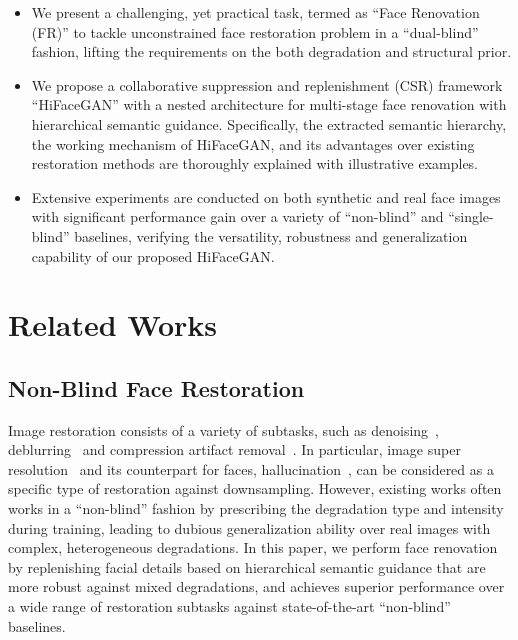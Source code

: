 \documentclass[sigconf]{acmart}
\begin{document}
\begin{itemize}
  \item We present a challenging, yet practical task, termed as ``Face Renovation (FR)'' to tackle unconstrained face restoration problem in a ``dual-blind'' fashion, lifting the requirements on the both degradation and structural prior.
  \item We propose a collaborative suppression and replenishment (CSR) framework ``HiFaceGAN'' with a nested architecture for multi-stage face renovation with hierarchical semantic guidance. Specifically, the extracted semantic hierarchy, the working mechanism of HiFaceGAN, and its advantages over existing restoration methods are thoroughly explained with illustrative examples.
  \item Extensive experiments are conducted on both synthetic and real face images with significant performance gain over a variety of ``non-blind'' and ``single-blind'' baselines, verifying the versatility, robustness and generalization capability of our proposed HiFaceGAN.
\end{itemize}

\section{Related Works} 

\begin{comment}
\begin{figure}[!t]
  \texttt{[image: images/Fig-intro\_v6.pdf]}
  \caption{Overview of the challenges in face renovation and the proposed framework.
  }
  \label{fig:intro}
\end{figure}

\end{comment}







\subsection{Non-Blind Face Restoration}
Image restoration consists of a variety of subtasks, such as denoising~\cite{RIDNet}\cite{VDNet}, deblurring~\cite{DeblurGAN}\cite{DeblurGANv2} and compression artifact removal~\cite{ARCNN}\cite{EPGAN}.
In particular, image super resolution~\cite{srcnn}\cite{edsr}\cite{srgan}\cite{esrgan} and its counterpart for faces, hallucination~\cite{fh_review}\cite{face_hallu_1}\cite{face_hallu_3}\cite{face_hallu_4}, can be considered as a specific type of restoration against downsampling.
However, existing works often works in a ``non-blind'' fashion by prescribing the degradation type and intensity during training, leading to dubious generalization ability over real images with complex, heterogeneous degradations. In this paper, we perform face renovation by replenishing facial details based on hierarchical semantic guidance that are more robust against mixed degradations, and achieves superior performance over a wide range of restoration subtasks against state-of-the-art ``non-blind'' baselines.
\end{document}
